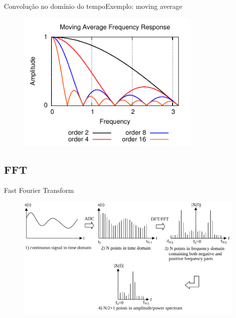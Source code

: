 \begin{frame}{Convolução no domínio do tempo}{Exemplo: moving average}
\begin{figure}
\includegraphics[width=0.8\textwidth]{./img/moving.pdf}
\end{figure}
\end{frame}

%
\subsection{FFT}

\begin{frame}{Fast Fourier Transform}
\begin{figure}
\includegraphics[width=\textwidth]{./img/fft1.pdf}
\end{figure}
\end{frame}

